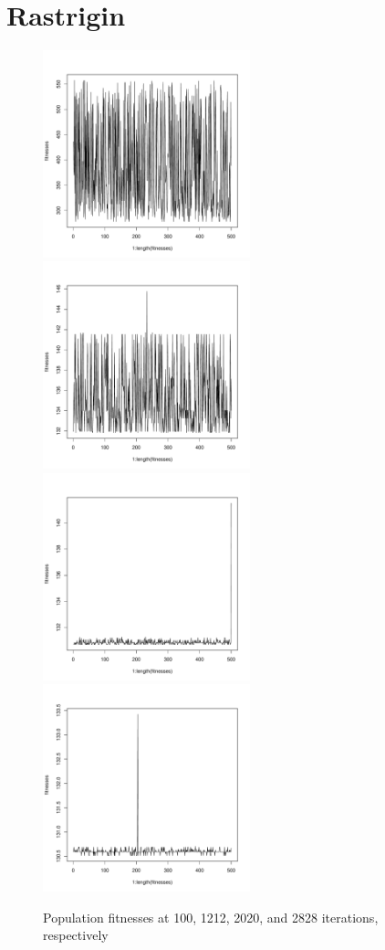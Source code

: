\documentclass[12pt]{article}
\begin{document}
\pagebreak

\section{Rastrigin}
\begin{figure}[!h]
        \begin{center}
		\includegraphics[width=60mm]{images/rastrigin.ss/ind_101.pdf}
		\includegraphics[width=60mm]{images/rastrigin.ss/ind_1212.pdf}
		\includegraphics[width=60mm]{images/rastrigin.ss/ind_2020.pdf}
		\includegraphics[width=60mm]{images/rastrigin.ss/ind_2828.pdf}
               	\caption{Population fitnesses at 100, 1212, 2020, and 2828 iterations, respectively}
                \label{rastrigin_ss_pop_fit}
        \end{center}
\end{figure}
\end{document}
